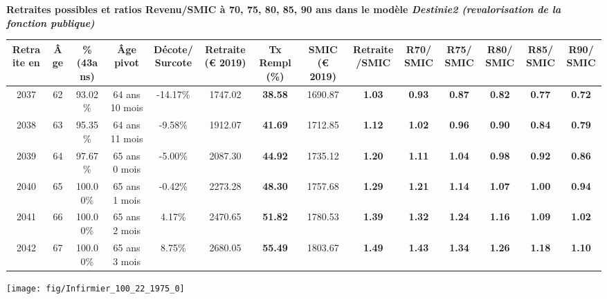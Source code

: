  \vspace{0.1cm} 
{\bf \noindent Retraites possibles et ratios Revenu/SMIC à 70, 75, 80, 85, 90 ans dans le modèle \emph{Destinie2 (revalorisation de la fonction publique)}}  
 
\begin{adjustbox}{max width=\textwidth} 
\begin{tabular}[htb]{|c|c||c|c|c||c|c||c|c||c|c|c|c|c|} 
\hline 
 Retraite en &  Âge &  \%(43ans) &  Âge pivot &  Décote/Surcote &  Retraite (\euro{} 2019) &  Tx Rempl(\%) &  SMIC (\euro{} 2019) &  Retraite/SMIC &  R70/SMIC &  R75/SMIC &  R80/SMIC &  R85/SMIC &  R90/SMIC \\ 
\hline \hline 
 2037 &  62 &  93.02\% &  64 ans 10 mois &  -14.17\% &  1747.02 &  {\bf 38.58} &  1690.87 &  {\bf 1.03} &  {\bf {\color{red} 0.93}} &  {\bf {\color{red} 0.87}} &  {\bf {\color{red} 0.82}} &  {\bf {\color{red} 0.77}} &  {\bf {\color{red} 0.72}} \\ 
\hline 
 2038 &  63 &  95.35\% &  64 ans 11 mois &  -9.58\% &  1912.07 &  {\bf 41.69} &  1712.85 &  {\bf 1.12} &  {\bf 1.02} &  {\bf {\color{red} 0.96}} &  {\bf {\color{red} 0.90}} &  {\bf {\color{red} 0.84}} &  {\bf {\color{red} 0.79}} \\ 
\hline 
 2039 &  64 &  97.67\% &  65 ans 0 mois &  -5.00\% &  2087.30 &  {\bf 44.92} &  1735.12 &  {\bf 1.20} &  {\bf 1.11} &  {\bf 1.04} &  {\bf {\color{red} 0.98}} &  {\bf {\color{red} 0.92}} &  {\bf {\color{red} 0.86}} \\ 
\hline 
 2040 &  65 &  100.00\% &  65 ans 1 mois &  -0.42\% &  2273.28 &  {\bf 48.30} &  1757.68 &  {\bf 1.29} &  {\bf 1.21} &  {\bf 1.14} &  {\bf 1.07} &  {\bf {\color{red} 1.00}} &  {\bf {\color{red} 0.94}} \\ 
\hline 
 2041 &  66 &  100.00\% &  65 ans 2 mois &  4.17\% &  2470.65 &  {\bf 51.82} &  1780.53 &  {\bf 1.39} &  {\bf 1.32} &  {\bf 1.24} &  {\bf 1.16} &  {\bf 1.09} &  {\bf 1.02} \\ 
\hline 
 2042 &  67 &  100.00\% &  65 ans 3 mois &  8.75\% &  2680.05 &  {\bf 55.49} &  1803.67 &  {\bf 1.49} &  {\bf 1.43} &  {\bf 1.34} &  {\bf 1.26} &  {\bf 1.18} &  {\bf 1.10} \\ 
\hline 
\hline 
\end{tabular} 
\end{adjustbox} 
 
 \vspace{0.1cm} 

 {\hspace{-2.2cm}\texttt{[image: fig/Infirmier\_100\_22\_1975\_0]}} 

